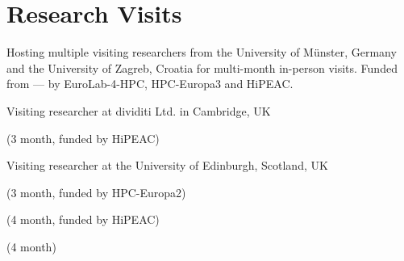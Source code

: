 \section{Research Visits}
\begin{cvitemize}
  \item Hosting multiple visiting researchers from the University of Münster, Germany and the University of Zagreb, Croatia for multi-month in-person visits.
  Funded from --- by EuroLab-4-HPC, HPC-Europa3 and HiPEAC.
   \item Visiting researcher at dividiti Ltd. in Cambridge, UK
      \begin{inlineItemize}
        \item {} (3 month, funded by HiPEAC)
      \end{inlineItemize}
    \item Visiting researcher at the University of Edinburgh, Scotland, UK
      \begin{inlineItemize}
        \item {} (3 month, funded by HPC-Europa2)
        \item {} (4 month, funded by HiPEAC)
        \item {} (4 month)
      \end{inlineItemize}
\end{cvitemize}